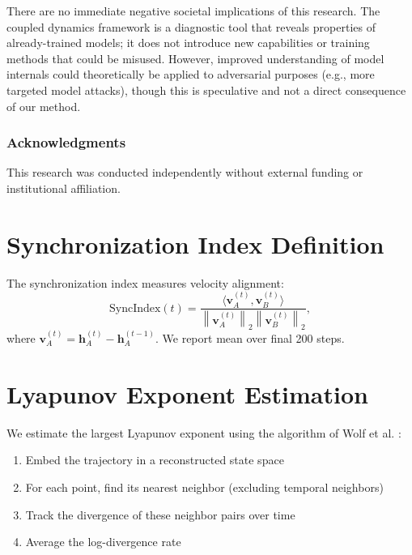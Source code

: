 \documentclass[10pt]{article} %
\theoremstyle{plain}
\theoremstyle{definition}
\theoremstyle{remark}
\renewcommand{\norm}[1]{\left\lVert#1\right\rVert}
\newcommand{\inner}[2]{\langle #1, #2 \rangle}
\renewcommand{\vect}[1]{\bm{#1}}
\begin{document}
There are no immediate negative societal implications of this research. The coupled dynamics framework is a diagnostic tool that reveals properties of already-trained models; it does not introduce new capabilities or training methods that could be misused. However, improved understanding of model internals could theoretically be applied to adversarial purposes (e.g., more targeted model attacks), though this is speculative and not a direct consequence of our method.

\subsubsection*{Acknowledgments}
This research was conducted independently without external funding or institutional affiliation.




\appendix

\section{Synchronization Index Definition}

The synchronization index measures velocity alignment:
\begin{equation}
    \text{SyncIndex}(t) = \frac{\inner{\vect{v}_A^{(t)}}{\vect{v}_B^{(t)}}}{\norm{\vect{v}_A^{(t)}}_2 \norm{\vect{v}_B^{(t)}}_2},
\end{equation}
where $\vect{v}_A^{(t)} = \vect{h}_A^{(t)} - \vect{h}_A^{(t-1)}$. We report mean over final 200 steps.

\section{Lyapunov Exponent Estimation}

We estimate the largest Lyapunov exponent using the algorithm of Wolf et al. \cite{wolf1985}:

\begin{enumerate}
    \item Embed the trajectory in a reconstructed state space
    \item For each point, find its nearest neighbor (excluding temporal neighbors)
    \item Track the divergence of these neighbor pairs over time
    \item Average the log-divergence rate
\end{enumerate}
\end{document}
